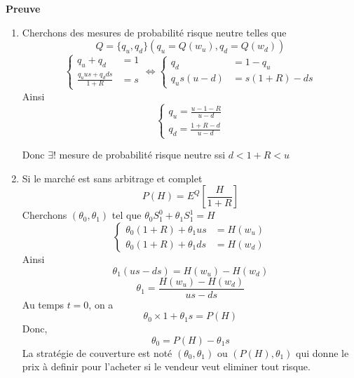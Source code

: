 \documentclass{article}
\theoremstyle{plain}
\theoremstyle{definition}
\begin{document}
\textbf{Preuve}
\begin{enumerate}
\item Cherchons des mesures de probabilit\'e risque neutre telles que
\begin{equation}
	Q=\{q_u,q_d\}(q_u=Q(w_u),q_d=Q(w_d))
\end{equation}
\begin{equation}
\left\{ \begin{array}{rcl}
q_u+q_d&=1\\
\frac{q_uus+q_d ds}{1+R}&=s
\end{array}\right. \Leftrightarrow
\left\{\begin{array}{rc}
q_d&=1-q_u\\
q_us(u-d)&=s(1+R)-ds
\end{array}\right.
\end{equation}
Ainsi\begin{equation}
\left\{\begin{array}{rc}
	q_u=\frac{u-1-R}{u-d}\\
	q_d=\frac{1+R-d}{u-d}
\end{array}\right.
\end{equation}

Donc $\exists !$ mesure de probabilit\'e risque neutre ssi $d<1+R<u$

\item Si le march\'e est sans arbitrage et complet
\begin{equation}
	P(H)=E^Q[\frac{H}{1+R}]
\end{equation}
Cherchons $(\theta_0,\theta_1)$ tel que $\theta_0S_1^0 + \theta_1S_1^1=H$
\begin{equation}
\left\{\begin{array}{rcl}
\theta_0(1+R)+\theta_1 us&=H(w_u)\\
\theta_0(1+R)+\theta_1 ds&=H(w_d)
\end{array}\right.
\end{equation}
Ainsi
\begin{equation}
	\theta_1(us-ds)=H(w_u)-H(w_d)
\end{equation}
\begin{equation}
	\theta_1=\frac{H(w_u)-H(w_d)}{us-ds}
\end{equation}
Au temps $t=0$, on a
\begin{equation}
	\theta_0\times 1+\theta_1 s=P(H)
\end{equation}
Donc,
\begin{equation}
	\theta_0=P(H)-\theta_1 s
\end{equation}
La strat\'egie de couverture est not\'e $(\theta_0,\theta_1)$ ou $(P(H),\theta_1)$
qui donne le prix \`a definir pour l'acheter si le vendeur veut eliminer tout risque.
\end{enumerate}
\end{document}
